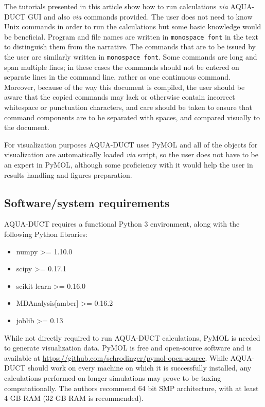 \documentclass[9pt,tutorial]{livecoms}
\begin{document}
The tutorials presented in this article show how to run calculations \textit{via} AQUA-DUCT GUI and also \textit{via} commands provided. The user does not need to know Unix commands in order to run the calculations but some basic knowledge would be beneficial. Program and file names are written in \texttt{monospace font} in the text to distinguish them from the narrative. The commands that are to be issued by the user are similarly written in \texttt{monospace font}. Some commands are long and span multiple lines; in these cases the commands should not be entered on separate lines in the command line, rather as one continuous command. 
Moreover, because of the way this document is compiled, the user should be aware that the copied commands may lack or otherwise contain incorrect whitespace or punctuation characters, and care should be taken to ensure that command components are to be separated with spaces, and compared visually to the document.

For visualization purposes AQUA-DUCT uses PyMOL and all of the objects for visualization are automatically loaded \textit{via} script, so the user does not have to be an expert in PyMOL, although some proficiency with it would help the user in results handling and figures preparation.

\subsection{Software/system requirements}
AQUA-DUCT requires a functional Python 3 environment, along with the following Python libraries:
\begin{itemize}
    \item numpy >= 1.10.0
    \item scipy >= 0.17.1
    \item scikit-learn >= 0.16.0
    \item MDAnalysis[amber] >= 0.16.2
    \item joblib >= 0.13
\end{itemize}
While not directly required to run AQUA-DUCT calculations, PyMOL is needed to generate visualization data.
PyMOL is free and open-source software and is available at \url{https://github.com/schrodinger/pymol-open-source}.
While AQUA-DUCT should work on every machine on which it is successfully installed, any calculations performed on longer simulations may prove to be taxing computationally. The authors recommend 64 bit SMP architecture, with at least 4 GB RAM (32 GB RAM is recommended). 
\end{document}
